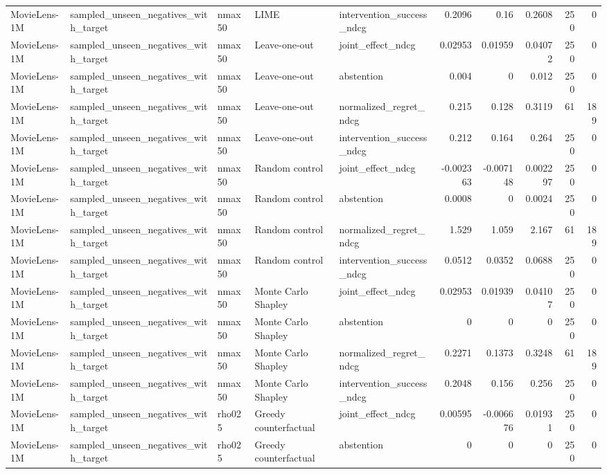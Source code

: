\begin{table}[t]
{\begin{tabular}{lllllrrrrr}
MovieLens-1M & sampled\_unseen\_negatives\_with\_target & nmax50 & LIME & intervention\_success\_ndcg & 0.2096 & 0.16 & 0.2608 & 250 & 0 \\
MovieLens-1M & sampled\_unseen\_negatives\_with\_target & nmax50 & Leave-one-out & joint\_effect\_ndcg & 0.02953 & 0.01959 & 0.04072 & 250 & 0 \\
MovieLens-1M & sampled\_unseen\_negatives\_with\_target & nmax50 & Leave-one-out & abstention & 0.004 & 0 & 0.012 & 250 & 0 \\
MovieLens-1M & sampled\_unseen\_negatives\_with\_target & nmax50 & Leave-one-out & normalized\_regret\_ndcg & 0.215 & 0.128 & 0.3119 & 61 & 189 \\
MovieLens-1M & sampled\_unseen\_negatives\_with\_target & nmax50 & Leave-one-out & intervention\_success\_ndcg & 0.212 & 0.164 & 0.264 & 250 & 0 \\
MovieLens-1M & sampled\_unseen\_negatives\_with\_target & nmax50 & Random control & joint\_effect\_ndcg & -0.002363 & -0.007148 & 0.002297 & 250 & 0 \\
MovieLens-1M & sampled\_unseen\_negatives\_with\_target & nmax50 & Random control & abstention & 0.0008 & 0 & 0.0024 & 250 & 0 \\
MovieLens-1M & sampled\_unseen\_negatives\_with\_target & nmax50 & Random control & normalized\_regret\_ndcg & 1.529 & 1.059 & 2.167 & 61 & 189 \\
MovieLens-1M & sampled\_unseen\_negatives\_with\_target & nmax50 & Random control & intervention\_success\_ndcg & 0.0512 & 0.0352 & 0.0688 & 250 & 0 \\
MovieLens-1M & sampled\_unseen\_negatives\_with\_target & nmax50 & Monte Carlo Shapley & joint\_effect\_ndcg & 0.02953 & 0.01939 & 0.04107 & 250 & 0 \\
MovieLens-1M & sampled\_unseen\_negatives\_with\_target & nmax50 & Monte Carlo Shapley & abstention & 0 & 0 & 0 & 250 & 0 \\
MovieLens-1M & sampled\_unseen\_negatives\_with\_target & nmax50 & Monte Carlo Shapley & normalized\_regret\_ndcg & 0.2271 & 0.1373 & 0.3248 & 61 & 189 \\
MovieLens-1M & sampled\_unseen\_negatives\_with\_target & nmax50 & Monte Carlo Shapley & intervention\_success\_ndcg & 0.2048 & 0.156 & 0.256 & 250 & 0 \\
MovieLens-1M & sampled\_unseen\_negatives\_with\_target & rho025 & Greedy counterfactual & joint\_effect\_ndcg & 0.00595 & -0.006676 & 0.01931 & 250 & 0 \\
MovieLens-1M & sampled\_unseen\_negatives\_with\_target & rho025 & Greedy counterfactual & abstention & 0 & 0 & 0 & 250 & 0 \\

\end{tabular}}
\end{table}
